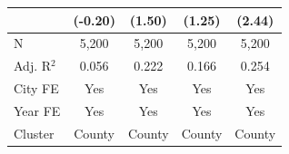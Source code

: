 \begin{tabular*}{\textwidth}{@{\extracolsep{\fill}}lcccc}
                        & (-0.20)                        & (1.50)                              & (1.25)                                 & (2.44)\\   
   \hline
   N         & 5,200                           & 5,200                                & 5,200                                   & 5,200\\  
   Adj. R$^2$       & 0.056                           & 0.222                                & 0.166                                   & 0.254\\  
   City FE              & Yes                             & Yes                                  & Yes                                     & Yes\\  
   Year FE              & Yes                             & Yes                                  & Yes                                     & Yes\\  
   Cluster              & County & County & County & County\\  
   \bottomrule
\end{tabular*}
\par\endgroup

